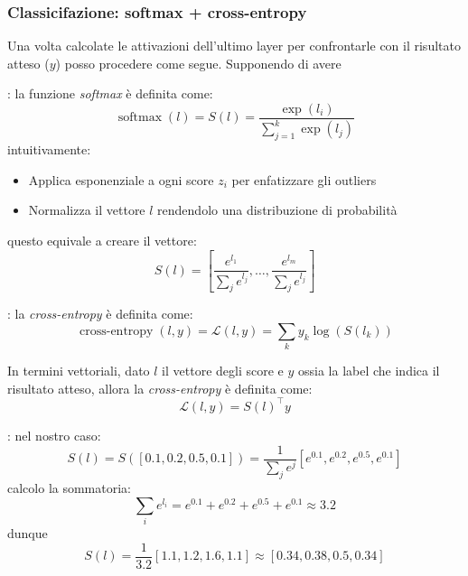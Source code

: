 \subsubsection{Classicifazione: softmax + cross-entropy}
Una volta calcolate le attivazioni dell'ultimo layer per confrontarle con il risultato atteso ($ y $) posso procedere come segue. Supponendo di avere
\begin{center}
\end{center}
: la funzione \textit{softmax} è definita come:
\[
	\operatorname{softmax}\left(l\right) = S\left(l\right) = \frac{\exp\left(l_i\right)}{\sum_{j=1}^{k} \exp\left(l_j\right)}
\]
intuitivamente:
\begin{itemize}
	\item Applica esponenziale a ogni score $ z_i $ per enfatizzare gli outliers
	\item Normalizza il vettore $ l $ rendendolo una distribuzione di probabilità
\end{itemize}
questo equivale a creare il vettore:
\[
	S\left(l\right) = \left[\frac{e^{l_1}}{\sum_{j} e^{l_j}}, \ldots , \frac{e^{l_m}}{\sum_{j} e^{l_j}}\right]
\]

\vskip3mm
: la \textit{cross-entropy} è definita come:
\[
	\operatorname{cross-entropy}\left(l, y\right) = \mathcal{L}\left(l,y\right) = \sum_{k} y_k \log \left(S\left(l_k\right)\right)
\]

In termini vettoriali, dato $ l $ il vettore degli score e $ y $ ossia la label che indica il risultato atteso, allora la \textit{cross-entropy} è definita come:
\[
	\mathcal{L}\left(l, y\right) = S(l)^{\top}y
\]





: nel nostro caso:
\[
	S \left(l\right) = S\left(\left[0.1,0.2, 0.5, 0.1\right]\right) = \frac{1}{\sum_{j} e^{j}} \left[e^{0.1}, e^{0.2}, e^{0.5}, e^{0.1}\right]
\]
calcolo la sommatoria:
\[
	\sum_i e^{l_i} = e^{0.1} + e^{0.2} + e^{0.5} + e^{0.1} \approx 3.2
\]
dunque
\[
	S\left(l\right) = \frac{1}{3.2} \left[ 1.1, 1.2, 1.6, 1.1\right] \approx \left[ 0.34, 0.38, 0.5, 0.34 \right]
\]


